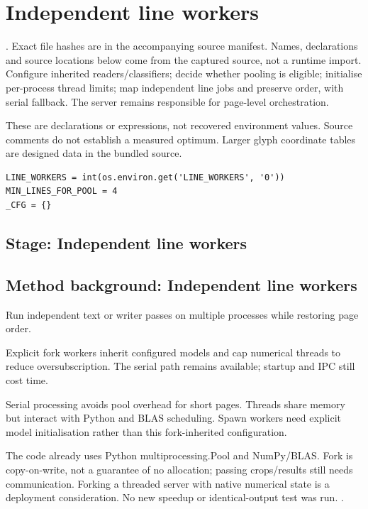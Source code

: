 \chapter{Independent line workers}\label{module:web-lineworkers}
. Exact file hashes are in the accompanying source manifest. Names, declarations and source locations below come from the captured source, not a runtime import.
Configure inherited readers/classifiers; decide whether pooling is eligible; initialise per-process thread limits; map independent line jobs and preserve order, with serial fallback. The server remains responsible for page-level orchestration.


These are declarations or expressions, not recovered environment values. Source comments do not establish a measured optimum. Larger glyph coordinate tables are designed data in the bundled source.
\begin{lstlisting}[style=plain]
LINE_WORKERS = int(os.environ.get('LINE_WORKERS', '0'))
MIN_LINES_FOR_POOL = 4
_CFG = {}
\end{lstlisting}
\section*{Stage: Independent line workers}
\section{Method background: Independent line workers}\label{method:workers}
Run independent text or writer passes on multiple processes while restoring page order.


Explicit fork workers inherit configured models and cap numerical threads to reduce oversubscription. The serial path remains available; startup and IPC still cost time.


Serial processing avoids pool overhead for short pages. Threads share memory but interact with Python and BLAS scheduling. Spawn workers need explicit model initialisation rather than this fork-inherited configuration.


The code already uses Python multiprocessing.Pool and NumPy/BLAS. Fork is copy-on-write, not a guarantee of no allocation; passing crops/results still needs communication. Forking a threaded server with native numerical state is a deployment consideration. No new speedup or identical-output test was run. \cite{pythonmp,numpymatmul}.


